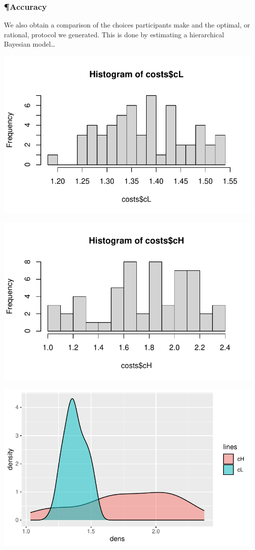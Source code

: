 \hypertarget{accuracy}{%
\subsubsection{¶Accuracy}\label{accuracy}}

We also obtain a comparison of the choices participants make and the
optimal, or rational, protocol we generated. This is done by estimating
a hierarchical Bayesian model\ldots{}

\includegraphics{thesis-file-ppq_files/figure-latex/unnamed-chunk-17-1.pdf}

\includegraphics{thesis-file-ppq_files/figure-latex/unnamed-chunk-17-2.pdf}

\includegraphics{thesis-file-ppq_files/figure-latex/unnamed-chunk-17-3.pdf}

